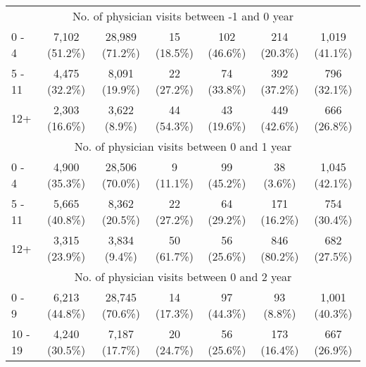 \documentclass{article}
\begin{document}
\begin{table}[htbp]
\begin{tabular}{l*{6}{c}}
\multicolumn{7}{c}{No. of physician visits between -1 and 0 year           }\\
  0 - 4                                                 &          7,102 (51.2\%)         &         28,989 (71.2\%)         &           15 (18.5\%)           &           102 (46.6\%)          &           214 (20.3\%)          &          1,019 (41.1\%)         \\
  5 - 11                                                &          4,475 (32.2\%)         &          8,091 (19.9\%)         &           22 (27.2\%)           &           74 (33.8\%)           &           392 (37.2\%)          &           796 (32.1\%)          \\
  12+                                                   &          2,303 (16.6\%)         &          3,622 (8.9\%)          &           44 (54.3\%)           &           43 (19.6\%)           &           449 (42.6\%)          &           666 (26.8\%)          \\
\multicolumn{7}{c}{No. of physician visits between 0 and 1 year            }\\
  0 - 4                                                 &          4,900 (35.3\%)         &         28,506 (70.0\%)         &            9 (11.1\%)           &           99 (45.2\%)           &            38 (3.6\%)           &          1,045 (42.1\%)         \\
  5 - 11                                                &          5,665 (40.8\%)         &          8,362 (20.5\%)         &           22 (27.2\%)           &           64 (29.2\%)           &           171 (16.2\%)          &           754 (30.4\%)          \\
  12+                                                   &          3,315 (23.9\%)         &          3,834 (9.4\%)          &           50 (61.7\%)           &           56 (25.6\%)           &           846 (80.2\%)          &           682 (27.5\%)          \\
\multicolumn{7}{c}{No. of physician visits between 0 and 2 year            }\\
  0 - 9                                                 &          6,213 (44.8\%)         &         28,745 (70.6\%)         &           14 (17.3\%)           &           97 (44.3\%)           &            93 (8.8\%)           &          1,001 (40.3\%)         \\
  10 - 19                                               &          4,240 (30.5\%)         &          7,187 (17.7\%)         &           20 (24.7\%)           &           56 (25.6\%)           &           173 (16.4\%)          &           667 (26.9\%)          \\

\end{tabular}
\end{table}
\end{document}
